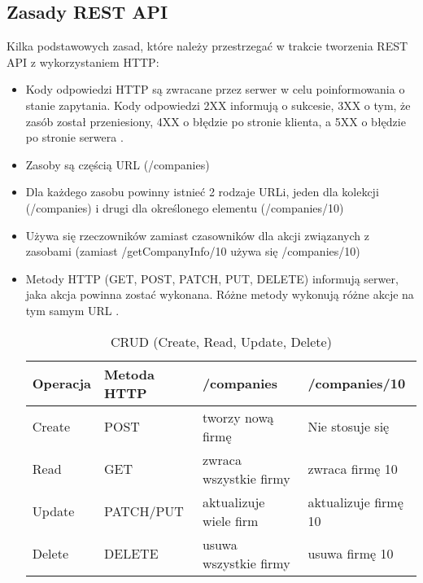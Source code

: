 	
	\subsection{Zasady REST API}
		Kilka podstawowych zasad, które należy przestrzegać w trakcie tworzenia REST API z wykorzystaniem HTTP:
		\begin{itemize}
			\item Kody odpowiedzi HTTP są zwracane przez serwer w celu poinformowania o stanie zapytania. Kody odpowiedzi 2XX informują o sukcesie, 3XX o tym, że zasób został przeniesiony, 4XX o błędzie po stronie klienta, a 5XX o błędzie po stronie serwera \cite{RESTfulWebServices}.
			\item Zasoby są częścią URL (/companies)
			\item Dla każdego zasobu powinny istnieć 2 rodzaje URLi, jeden dla kolekcji (/companies) i drugi dla określonego elementu (/companies/10)
			\item Używa się rzeczowników zamiast czasowników dla akcji związanych z zasobami (zamiast /getCompanyInfo/10 używa się /companies/10)
			\item Metody HTTP (GET, POST, PATCH, PUT, DELETE) informują serwer, jaka akcja powinna zostać wykonana. Różne metody wykonują różne akcje na tym samym URL \cite{RESTfulWebServicesCookbook}.
			\begin{table}[H]
				\begin{tabular}{ |l|l|l|l| } 
					\hline
					Operacja 	& Metoda HTTP 	& /companies 				& /companies/10 		\\ 
					\hline
					Create 		& POST 			& tworzy nową firmę 		& Nie stosuje się 		\\ 
					\hline
					Read 		& GET 			& zwraca wszystkie firmy 	& zwraca firmę 10 		\\ 
					\hline
					Update 		& PATCH/PUT 	& aktualizuje wiele firm 	& aktualizuje firmę 10 	\\ 
					\hline
					Delete 		& DELETE 		& usuwa wszystkie firmy 	& usuwa firmę 10 		\\ 
					\hline	
				\end{tabular}
				\caption{\label{tab:CRUD} CRUD (Create, Read, Update, Delete)}
			\end{table}
			

\end{itemize}
